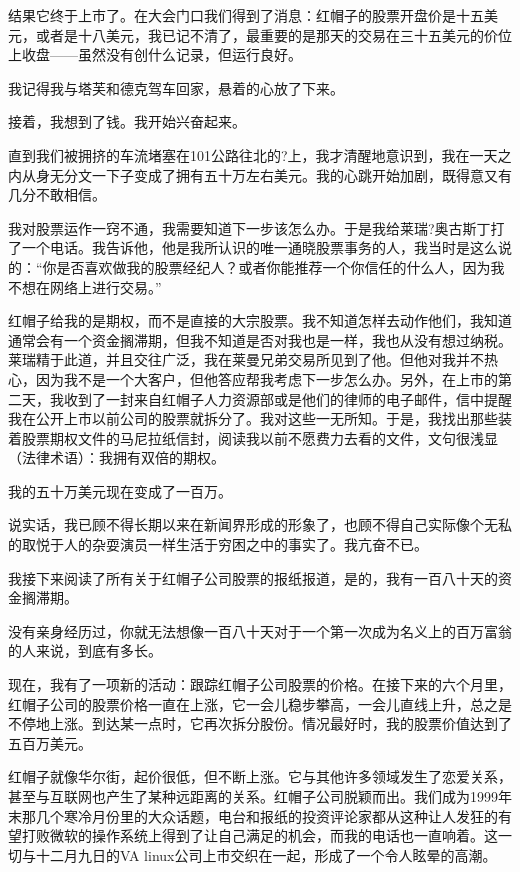 结果它终于上市了。在大会门口我们得到了消息：红帽子的股票开盘价是十五美元，或者是十八美元，我已记不清了，最重要的是那天的交易在三十五美元的价位上收盘——虽然没有创什么记录，但运行良好。

我记得我与塔芙和德克驾车回家，悬着的心放了下来。

接着，我想到了钱。我开始兴奋起来。

直到我们被拥挤的车流堵塞在101公路往北的?上，我才清醒地意识到，我在一天之内从身无分文一下子变成了拥有五十万左右美元。我的心跳开始加剧，既得意又有几分不敢相信。

我对股票运作一窍不通，我需要知道下一步该怎么办。于是我给莱瑞?奥古斯丁打了一个电话。我告诉他，他是我所认识的唯一通晓股票事务的人，我当时是这么说的：“你是否喜欢做我的股票经纪人？或者你能推荐一个你信任的什么人，因为我不想在网络上进行交易。”

红帽子给我的是期权，而不是直接的大宗股票。我不知道怎样去动作他们，我知道通常会有一个资金搁滞期，但我不知道是否对我也是一样，我也从没有想过纳税。莱瑞精于此道，并且交往广泛，我在莱曼兄弟交易所见到了他。但他对我并不热心，因为我不是一个大客户，但他答应帮我考虑下一步怎么办。另外，在上市的第二天，我收到了一封来自红帽子人力资源部或是他们的律师的电子邮件，信中提醒我在公开上市以前公司的股票就拆分了。我对这些一无所知。于是，我找出那些装着股票期权文件的马尼拉纸信封，阅读我以前不愿费力去看的文件，文句很浅显（法律术语）：我拥有双倍的期权。

我的五十万美元现在变成了一百万。

说实话，我已顾不得长期以来在新闻界形成的形象了，也顾不得自己实际像个无私的取悦于人的杂耍演员一样生活于穷困之中的事实了。我亢奋不已。

我接下来阅读了所有关于红帽子公司股票的报纸报道，是的，我有一百八十天的资金搁滞期。

没有亲身经历过，你就无法想像一百八十天对于一个第一次成为名义上的百万富翁的人来说，到底有多长。

现在，我有了一项新的活动：跟踪红帽子公司股票的价格。在接下来的六个月里，红帽子公司的股票价格一直在上涨，它一会儿稳步攀高，一会儿直线上升，总之是不停地上涨。到达某一点时，它再次拆分股份。情况最好时，我的股票价值达到了五百万美元。

红帽子就像华尔街，起价很低，但不断上涨。它与其他许多领域发生了恋爱关系，甚至与互联网也产生了某种远距离的关系。红帽子公司脱颖而出。我们成为1999年末那几个寒冷月份里的大众话题，电台和报纸的投资评论家都从这种让人发狂的有望打败微软的操作系统上得到了让自己满足的机会，而我的电话也一直响着。这一切与十二月九日的VA linux公司上市交织在一起，形成了一个令人眩晕的高潮。

